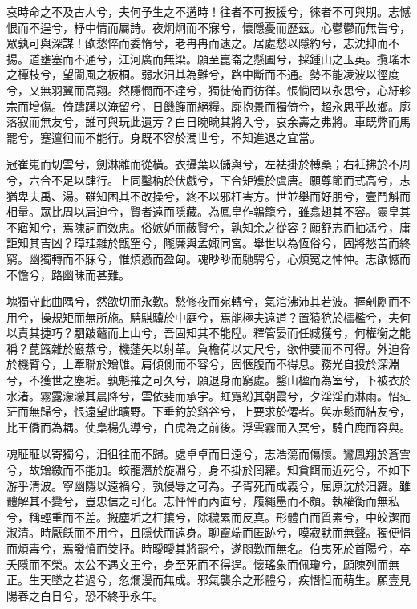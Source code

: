 
\begin{pinyinscope}
哀時命之不及古人兮，夫何予生之不遘時！往者不可扳援兮，徠者不可與期。志憾恨而不逞兮，杼中情而屬詩。夜炯炯而不寐兮，懷隱憂而歷茲。心鬱鬱而無告兮，眾孰可與深謀！欿愁悴而委惰兮，老冉冉而逮之。居處愁以隱約兮，志沈抑而不揚。道壅塞而不通兮，江河廣而無梁。願至崑崙之懸圃兮，採鍾山之玉英。攬瑤木之橝枝兮，望閬風之板桐。弱水汨其為難兮，路中斷而不通。勢不能凌波以徑度兮，又無羽翼而高翔。然隱憫而不達兮，獨徙倚而彷徉。悵惝罔以永思兮，心紆軫宗而增傷。倚躊躇以淹留兮，日饑饉而絕糧。廓抱景而獨倚兮，超永思乎故鄉。廓落寂而無友兮，誰可與玩此遺芳？白日晼晼其將入兮，哀余壽之弗將。車既弊而馬罷兮，蹇邅徊而不能行。身既不容於濁世兮，不知進退之宜當。

冠崔嵬而切雲兮，劍淋離而從橫。衣攝葉以儲與兮，左袪掛於榑桑；右衽拂於不周兮，六合不足以肆行。上同鑿枘於伏戲兮，下合矩矱於虞唐。願尊節而式高兮，志猶卑夫禹、湯。雖知困其不改操兮，終不以邪枉害方。世並舉而好朋兮，壹鬥斛而相量。眾比周以肩迫兮，賢者遠而隱藏。為鳳皇作鶉籠兮，雖翕翅其不容。靈皇其不寤知兮，焉陳詞而效忠。俗嫉妒而蔽賢兮，孰知余之從容？願舒志而抽馮兮，庸詎知其吉凶？璋珪雜於甑窐兮，隴廉與孟娵同宮。舉世以為恆俗兮，固將愁苦而終窮。幽獨轉而不寐兮，惟煩懣而盈匈。魂眇眇而馳騁兮，心煩冤之忡忡。志欿憾而不憺兮，路幽昧而甚難。

塊獨守此曲隅兮，然欿切而永歎。愁修夜而宛轉兮，氣涫沸沛其若波。握剞劂而不用兮，操規矩而無所施。騁騏驥於中庭兮，焉能極夫遠道？置猿狖於櫺檻兮，夫何以責其捷巧？駟跛虌而上山兮，吾固知其不能陞。釋管晏而任臧獲兮，何權衡之能稱？菎簬雜於黀蒸兮，機蓬矢以射革。負檐荷以丈尺兮，欲伸要而不可得。外迫脅於機臂兮，上牽聯於矰隿。肩傾側而不容兮，固愜腹而不得息。務光自投於深淵兮，不獲世之塵垢。孰魁摧之可久兮，願退身而窮處。鑿山楹而為室兮，下被衣於水渚。霧露濛濛其晨降兮，雲依斐而承宇。虹霓紛其朝霞兮，夕淫淫而淋雨。怊茫茫而無歸兮，悵遠望此曠野。下垂釣於谿谷兮，上要求於僊者。與赤鬆而結友兮，比王僑而為耦。使梟楊先導兮，白虎為之前後。浮雲霧而入冥兮，騎白鹿而容與。

魂聇聇以寄獨兮，汨徂往而不歸。處卓卓而日遠兮，志浩蕩而傷懷。鸞鳳翔於蒼雲兮，故矰繳而不能加。蛟龍潛於旋淵兮，身不掛於罔羅。知貪餌而近死兮，不如下游乎清波。寧幽隱以遠禍兮，孰侵辱之可為。子胥死而成義兮，屈原沈於汨羅。雖體解其不變兮，豈忠信之可化。志怦怦而內直兮，履繩墨而不頗。執權衡而無私兮，稱輕重而不差。摡塵垢之枉攘兮，除穢累而反真。形體白而質素兮，中皎潔而淑清。時厭飫而不用兮，且隱伏而遠身。聊竄端而匿跡兮，嗼寂默而無聲。獨便悁而煩毒兮，焉發憤而筊抒。時曖曖其將罷兮，遂悶歎而無名。伯夷死於首陽兮，卒夭隱而不榮。太公不遇文王兮，身至死而不得逞。懷瑤象而佩瓊兮，願陳列而無正。生天墜之若過兮，忽爛漫而無成。邪氣襲余之形體兮，疾憯怛而萌生。願壹見陽春之白日兮，恐不終乎永年。


\end{pinyinscope}